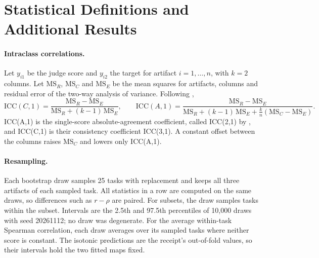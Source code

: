 \section{Statistical Definitions and Additional Results}
\label{app:statistics}

\paragraph{Intraclass correlations.}
Let $y_{i1}$ be the judge score and $y_{i2}$ the target for artifact $i=1,\dots,n$, with $k=2$ columns.
Let $\mathrm{MS}_R$, $\mathrm{MS}_C$ and $\mathrm{MS}_E$ be the mean squares for artifacts, columns and residual error of the two-way analysis of variance.
Following \citet{mcgraw1996forming},
\begin{equation}
\mathrm{ICC}(C,1)=\frac{\mathrm{MS}_R-\mathrm{MS}_E}{\mathrm{MS}_R+(k-1)\,\mathrm{MS}_E},
\qquad
\mathrm{ICC}(A,1)=\frac{\mathrm{MS}_R-\mathrm{MS}_E}{\mathrm{MS}_R+(k-1)\,\mathrm{MS}_E+\frac{k}{n}\left(\mathrm{MS}_C-\mathrm{MS}_E\right)}.
\end{equation}
ICC(A,1) is the single-score absolute-agreement coefficient, called ICC(2,1) by \citet{shrout1979intraclass}, and ICC(C,1) is their consistency coefficient ICC(3,1).
A constant offset between the columns raises $\mathrm{MS}_C$ and lowers only ICC(A,1).

\paragraph{Resampling.}
Each bootstrap draw samples 25 tasks with replacement and keeps all three artifacts of each sampled task.
All statistics in a row are computed on the same draws, so differences such as $r-\rho$ are paired.
For subsets, the draw samples tasks within the subset.
Intervals are the 2.5th and 97.5th percentiles of 10,000 draws with seed 20261112; no draw was degenerate.
For the average within-task Spearman correlation, each draw averages over its sampled tasks where neither score is constant.
The isotonic predictions are the receipt's out-of-fold values, so their intervals hold the two fitted maps fixed.

